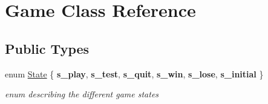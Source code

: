 \hypertarget{classGame}{}\section{Game Class Reference}
\label{classGame}
\subsection*{Public Types}
\begin{DoxyCompactItemize}
\item 
\mbox{\label{classGame_addc0d11b008aeca49c8bd8d5ed80559e}} 
enum \mbox{\hyperlink{classGame_addc0d11b008aeca49c8bd8d5ed80559e}{State}} \{ \newline
{\bfseries s\+\_\+play}, 
{\bfseries s\+\_\+test}, 
{\bfseries s\+\_\+quit}, 
{\bfseries s\+\_\+win}, 
\newline
{\bfseries s\+\_\+lose}, 
{\bfseries s\+\_\+initial}
 \}
\begin{DoxyCompactList}\small\item\em enum describing the different game states \end{DoxyCompactList}\end{DoxyCompactItemize}
